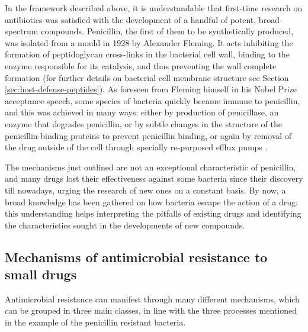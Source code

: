 In the framework described above, it is understandable that first-time research on antibiotics was satisfied with the development of a handful of potent, broad-spectrum compounds.
%
Penicillin, the first of them to be synthetically produced, was isolated from a mould in 1928 by Alexander Fleming. It acts inhibiting the formation of peptidoglycan cross-links in the bacterial cell wall, binding to the enzyme responsible for its catalysis, and thus preventing the wall complete formation \cite{Gordon2000} (for further details on bacterial cell membrane structure see Section \ref{sec:host-defense-peptides}).
%
As foreseen from Fleming himself in his Nobel Prize acceptance speech, some species of bacteria quickly became immune to penicillin, and this was achieved in many ways: either by production of penicillase, an enzyme that degrades penicillin, or by subtle changes in the structure of the penicillin-binding proteins to prevent penicillin binding, or again by removal of the drug outside of the cell through specially re-purposed efflux pumps \cite{???}.

The mechanisms just outlined are not an exceptional characteristic of penicillin, and many drugs lost their effectiveness against some bacteria since their discovery till nowadays, urging the research of new ones on a constant basis. By now, a broad knowledge has been gathered on how bacteria escape the action of a drug: this understanding helps interpreting the pitfalls of existing drugs and identifying the characteristics sought in the developments of new compounds.


\subsection{Mechanisms of antimicrobial resistance to small drugs} \label{sec:AMR_mechs}
Antimicrobial resistance can manifest through many different mechanisms, which can be grouped in three main classes, in line with the three processes mentioned in the example of the penicillin resistant bacteria.

